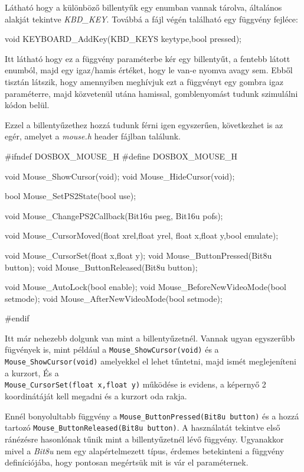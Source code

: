 Látható hogy a különböző billentyűk egy enumban vannak tárolva, általános alakját tekintve \textit{KBD\_KEY}.
Továbbá a fájl végén található egy függvény fejléce:

\begin{cpp}
    void KEYBOARD_AddKey(KBD_KEYS keytype,bool pressed);
\end{cpp}

Itt látható hogy ez a függvény paraméterbe kér egy billentyűt, a fentebb látott enumból, majd egy igaz/hamis értéket, hogy le van-e nyomva avagy sem. Ebből tisztán látszik, hogy amennyiben meghívjuk ezt a függvényt egy gombra igaz paraméterre, majd közvetenül utána hamissal, gomblenyomást tudunk szimulálni kódon belül. 

Ezzel a billentyűzethez hozzá tudunk férni igen egyszerűen, következhet is az egér, amelyet a \textit{mouse.h} header fájlban találunk.

\begin{cpp}

    #ifndef DOSBOX_MOUSE_H
    #define DOSBOX_MOUSE_H
    
    
    void Mouse_ShowCursor(void);
    void Mouse_HideCursor(void);
    
    bool Mouse_SetPS2State(bool use);
    
    void Mouse_ChangePS2Callback(Bit16u pseg, Bit16u pofs);
    
    void Mouse_CursorMoved(float xrel,float yrel,
                           float x,float y,bool emulate);

    void Mouse_CursorSet(float x,float y);
    void Mouse_ButtonPressed(Bit8u button);
    void Mouse_ButtonReleased(Bit8u button);
    
    void Mouse_AutoLock(bool enable);
    void Mouse_BeforeNewVideoMode(bool setmode);
    void Mouse_AfterNewVideoMode(bool setmode);
    
    #endif

\end{cpp}

Itt már nehezebb dolgunk van mint a billentyűzetnél. Vannak ugyan egyszerűbb fügvények is, mint például a \verb|Mouse_ShowCursor(void)| és a \verb|Mouse_ShowCursor(void)| amelyekkel el lehet tűntetni, majd ismét meglejeníteni a kurzort,
És a\\ \verb|Mouse_CursorSet(float x,float y)| működése is evidens, a képernyő 2 koordinátáját kell megadni és a kurzort oda rakja.

Ennél bonyolultabb függvény a \verb|Mouse_ButtonPressed(Bit8u button)| és a hozzá tartozó \verb|Mouse_ButtonReleased(Bit8u button)|. A használatát tekintve első ránézésre hasonlónak tűnik mint a billentyűzetnél lévő függvény. Ugyanakkor mivel a \textit{Bit8u} nem egy alapértelmezett típus, érdemes betekinteni a függvény definíciójába, hogy pontosan megértsük mit is vár el paraméternek.

